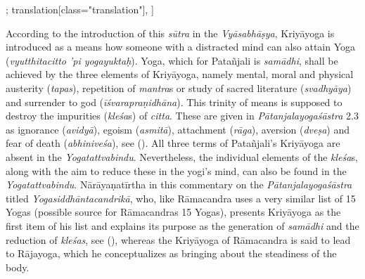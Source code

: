 \begin{alignment}[
    texts=edition[class="edition"];
    translation[class="translation"],
  ]
\begin{translation}
\begin{tlate}
{According to the introduction of this \textit{sūtra} in the \textit{Vyāsabhāṣya}, Kriyāyoga is introduced as a means how someone with a distracted mind can also attain Yoga (\textit{vyutthitacitto 'pi yogayuktaḥ}). Yoga, which for Patañjali is \textit{samādhi}, shall be achieved by the three elements of Kriyāyoga, namely mental, moral and physical austerity (\textit{tapas}), repetition of \textit{mantra}s or study of sacred literature (\textit{svadhyāya}) and surrender to god (\textit{īśvarapraṇidhāna}). This trinity of means is supposed to destroy the impurities (\textit{kleśa}s) of \textit{citta}. These are given in \textit{Pātanjalayogaśāstra} 2.3 as ignorance (\textit{avidyā}), egoism (\textit{asmitā}), attachment (\textit{rāga}), aversion (\textit{dveṣa}) and fear of death (\textit{abhiniveśa}), see (\citeauthor[1983:116]{yogasutra}). All three terms of Patañjali's Kriyāyoga are absent in the \textit{Yogatattvabindu}. Nevertheless, the individual elements of the \textit{kleśa}s, along with the aim to reduce these in the yogi's mind, can also be found in the \textit{Yogatattvabindu}. Nārāyaṇatīrtha in this commentary on the \textit{Pātanjalayogaśāstra} titled \textit{Yogasiddhāntacandrikā}, who, like Rāmacandra uses a very similar list of 15 Yogas (possible source for Rāmacandras 15 Yogas), presents Kriyāyoga as the first item of his list and explains its purpose as the generation of \textit{samādhi} and the reduction of \textit{kleśas}, see (\citeauthor[2000:71]{yogacandrika}), whereas the Kriyāyoga of Rāmacandra is said to lead to Rājayoga, which he conceptualizes as bringing about the steadiness of the body.}
\end{tlate}
 \ekdpb*{}
\end{translation}
\end{alignment}
